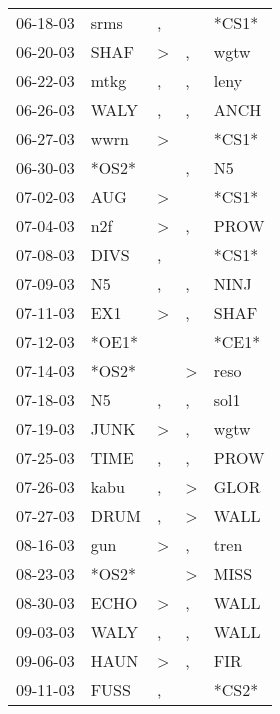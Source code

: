 \begin{supertabular}{lllll}
 06-18-03 &   srms &                , &                  &  *CS1* \\
 06-20-03 &   SHAF &     \textgreater &                , &   wgtw \\
 06-22-03 &   mtkg &                , &                , &   leny \\
 06-26-03 &   WALY &                , &                , &   ANCH \\
 06-27-03 &   wwrn &     \textgreater &                  &  *CS1* \\
 06-30-03 &  *OS2* &                  &                , &     N5 \\
 07-02-03 &    AUG &     \textgreater &                  &  *CS1* \\
 07-04-03 &    n2f &     \textgreater &                , &   PROW \\
 07-08-03 &   DIVS &                , &                  &  *CS1* \\
 07-09-03 &     N5 &                , &                , &   NINJ \\
 07-11-03 &    EX1 &     \textgreater &                , &   SHAF \\
 07-12-03 &  *OE1* &                  &                  &  *CE1* \\
 07-14-03 &  *OS2* &                  &     \textgreater &   reso \\
 07-18-03 &     N5 &                , &                , &   sol1 \\
 07-19-03 &   JUNK &     \textgreater &                , &   wgtw \\
 07-25-03 &   TIME &                , &                , &   PROW \\
 07-26-03 &   kabu &                , &     \textgreater &   GLOR \\
 07-27-03 &   DRUM &                , &     \textgreater &   WALL \\
 08-16-03 &    gun &     \textgreater &                , &   tren \\
 08-23-03 &  *OS2* &                  &     \textgreater &   MISS \\
 08-30-03 &   ECHO &     \textgreater &                , &   WALL \\
 09-03-03 &   WALY &                , &                , &   WALL \\
 09-06-03 &   HAUN &     \textgreater &                , &    FIR \\
 09-11-03 &   FUSS &                , &                  &  *CS2* \\

\end{supertabular}
